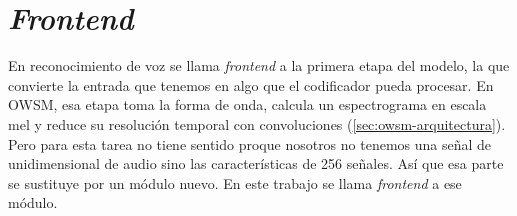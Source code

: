 %
%
%
%

\section{\textit{Frontend}}
\label{sec:frontend}

En reconocimiento de voz se llama \textit{frontend} a la primera etapa del modelo, la que convierte la entrada que tenemos en algo que el codificador pueda procesar. En OWSM, esa etapa toma la forma de onda, calcula un espectrograma en escala mel y reduce su resolución temporal con convoluciones (\cref{sec:owsm-arquitectura}). Pero para esta tarea no tiene sentido proque nosotros no tenemos una señal de unidimensional de audio sino las características de 256 señales. Así que esa parte se sustituye por un módulo nuevo. En este trabajo se llama \textit{frontend} a ese módulo.


